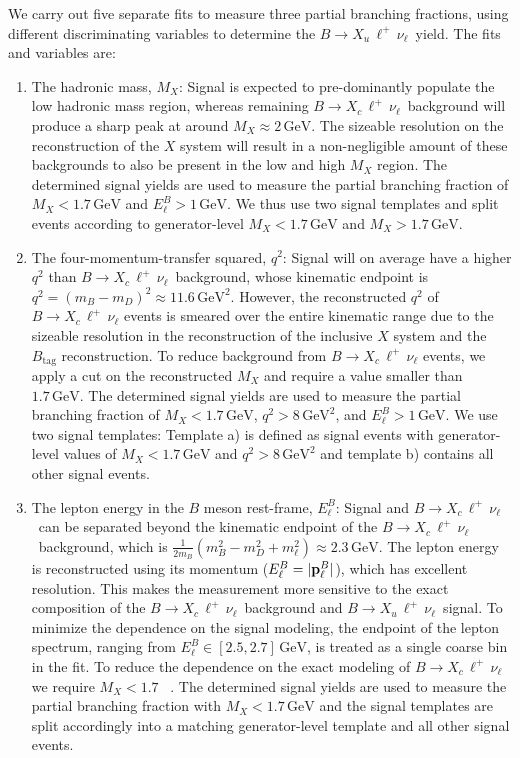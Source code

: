 \documentclass[twocolumn,aps,prd,superscriptaddress,nofootinbib,floatfix,preprintnumbers,a4]{revtex4-1}
\newcommand{\bulnu}{\ensuremath{B \to X_u \, \ell^+\, \nu_{\ell}}\xspace}
\newcommand{\bclnu}{\ensuremath{B \to X_c \, \ell^+\, \nu_{\ell}}\xspace}
\begin{document}
We carry out five separate fits to measure three partial branching fractions, using different discriminating variables to determine the \bulnu\ yield. The fits and variables are:
\begin{enumerate}
  \item The hadronic mass, $M_X$: Signal is expected to pre-dominantly populate the low hadronic mass region, whereas remaining \bclnu\ background will produce a sharp peak at around $M_X \approx 2 \, \text{GeV}$. The sizeable resolution on the reconstruction of the $X$ system will result in a non-negligible amount of these backgrounds to also be present in the low and high $M_X$ region. The determined signal yields are used to measure the partial branching fraction of $M_X < 1.7 \, \mathrm{GeV}$ and $E_\ell^B > 1 \, \text{GeV}$. We thus use two signal templates and split events according to generator-level $M_X < 1.7 \, \mathrm{GeV}$ and $M_X > 1.7 \, \mathrm{GeV}$.
    \item The four-momentum-transfer squared, $q^2$: Signal will on average have a higher $q^2$ than \bclnu\ background, whose kinematic endpoint is $q^2 = \left( m_B - m_D \right)^2 \approx 11.6 \, \text{GeV}^2$. However, the reconstructed $q^2$ of \bclnu events is smeared over the entire kinematic range due to the sizeable resolution in the reconstruction of the inclusive $X$ system and the $B_{\mathrm{tag}}$ reconstruction. To reduce background from \bclnu events, we apply a cut on the reconstructed $M_X$ and require a value smaller than $1.7 \, \mathrm{GeV}$. The determined signal yields are used to measure the partial branching fraction of $M_X < 1.7 \, \mathrm{GeV}$, $q^2 > 8 \, \mathrm{GeV}^2$, and $E_\ell^B > 1 \, \text{GeV}$. We use two signal templates: Template a) is defined as signal events with generator-level values of $M_X < 1.7 \, \mathrm{GeV}$ and $q^2 > 8 \, \mathrm{GeV}^2$ and template b) contains all other signal events. 
  \item The lepton energy in the $B$ meson rest-frame, $E_\ell^B$: Signal and \bclnu\ can be separated beyond the kinematic endpoint of the \bclnu\ background, which is \mbox{$\frac{1}{2 m_B} \left( m_B^2 - m_D^2 + m_\ell^2 \right) \approx 2.3 \, \text{GeV}$}. The lepton energy is reconstructed using its momentum (\mbox{$E_\ell^B = |\bold{p}_\ell^B|$}), which has excellent resolution. This makes the measurement more sensitive to the exact composition of the \bclnu\ background and \bulnu\ signal. To minimize the dependence on the signal modeling, the endpoint of the lepton spectrum, ranging from $E_\ell^B \in [2.5, 2.7] \, \text{GeV}$, is treated as a single coarse bin in the fit. To reduce the dependence on the exact modeling of \bclnu\, we require $M_X < 1.7$ \, . The determined signal yields are used to measure the partial branching fraction with $M_X < 1.7 \, \mathrm{GeV}$ and the signal templates are split accordingly into a matching generator-level template and all other signal events. 

\end{enumerate}
\end{document}
